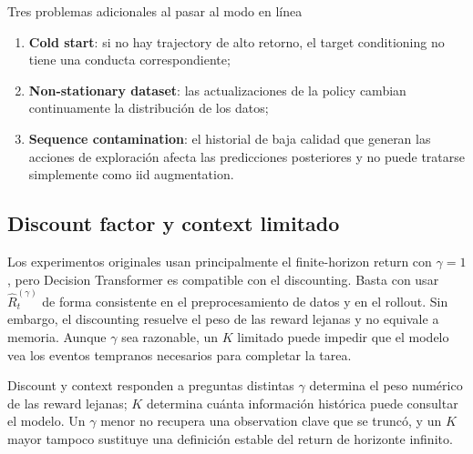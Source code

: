 \documentclass[a4paper]{article}
\begin{document}
\begin{warningbox}{Tres problemas adicionales al pasar al modo en línea}
\begin{enumerate}
  \item \textbf{Cold start}: si no hay trajectory de alto retorno, el target conditioning no tiene una conducta correspondiente;
  \item \textbf{Non-stationary dataset}: las actualizaciones de la policy cambian continuamente la distribución de los datos;
  \item \textbf{Sequence contamination}: el historial de baja calidad que generan las acciones de exploración afecta las predicciones posteriores y no puede tratarse simplemente como iid augmentation.
\end{enumerate}
\end{warningbox}


\subsection{Discount factor y context limitado}

Los experimentos originales usan principalmente el finite-horizon return con $\gamma=1$, pero Decision Transformer es compatible con el discounting. Basta con usar $\widehat{R}^{(\gamma)}_t$ de forma consistente en el preprocesamiento de datos y en el rollout. Sin embargo, el discounting resuelve el peso de las reward lejanas y no equivale a memoria. Aunque $\gamma$ sea razonable, un $K$ limitado puede impedir que el modelo vea los eventos tempranos necesarios para completar la tarea.

\begin{importantbox}{Discount y context responden a preguntas distintas}
$\gamma$ determina el peso numérico de las reward lejanas; $K$ determina cuánta información histórica puede consultar el modelo. Un $\gamma$ menor no recupera una observation clave que se truncó, y un $K$ mayor tampoco sustituye una definición estable del return de horizonte infinito.
\end{importantbox}
\end{document}
